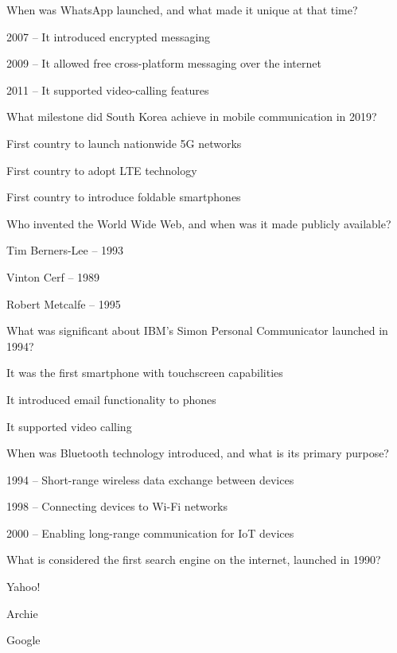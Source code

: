 \begin{enhancedmcq}{When was WhatsApp launched, and what made it unique at that time?}
\item 2007 – It introduced encrypted messaging
\item 2009 – It allowed free cross-platform messaging over the internet
\item 2011 – It supported video-calling features

\end{enhancedmcq}
\begin{enhancedmcq}{What milestone did South Korea achieve in mobile communication in 2019?}
\item First country to launch nationwide 5G networks
\item First country to adopt LTE technology
\item First country to introduce foldable smartphones

\end{enhancedmcq}
\begin{enhancedmcq}{Who invented the World Wide Web, and when was it made publicly available?}
\item Tim Berners-Lee – 1993
\item Vinton Cerf – 1989
\item Robert Metcalfe – 1995

\end{enhancedmcq}
\begin{enhancedmcq}{What was significant about IBM's Simon Personal Communicator launched in 1994?}
\item It was the first smartphone with touchscreen capabilities
\item It introduced email functionality to phones
\item It supported video calling

\end{enhancedmcq}
\begin{enhancedmcq}{When was Bluetooth technology introduced, and what is its primary purpose?}
\item 1994 – Short-range wireless data exchange between devices
\item 1998 – Connecting devices to Wi-Fi networks
\item 2000 – Enabling long-range communication for IoT devices

\end{enhancedmcq}
\begin{enhancedmcq}{What is considered the first search engine on the internet, launched in 1990?}
\item Yahoo!
\item Archie
\item Google

\end{enhancedmcq}
